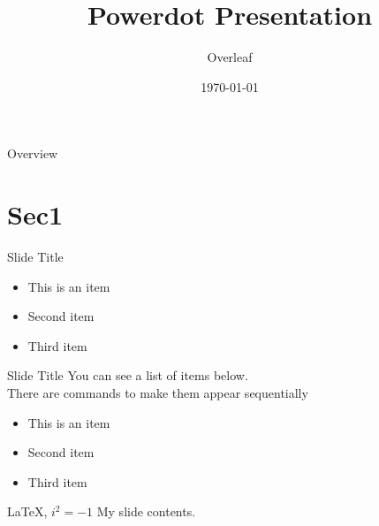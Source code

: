 \documentclass[paper=a4paper,style=default]{powerdot}
\title{Powerdot Presentation}
\author{Overleaf}
\date{\today}
\begin{document}
\maketitle

\begin{slide}[toc=,bm=]{Overview}
	\tableofcontents[content=sections]
\end{slide}

\section{Sec1}
\begin{slide}{Slide Title}
  \begin{itemize}
  \item This is an item
  \item Second item
  \item Third item
  \end{itemize}
\end{slide}


\begin{slide}{Slide Title}
	You can see a list of items below. \pause \\
	There are commands to make them appear sequentially
	\begin{itemize}[type=1]
		\item<2> This is an item
		\item<3> Second item
		\item<4> Third item
	\end{itemize}
\end{slide}

\begin{slide}[toc=,bm={LaTeX, i*i=-1}]{\color{red}\LaTeX, $i^2=-1$}
	My slide contents.
\end{slide}
\end{document}
